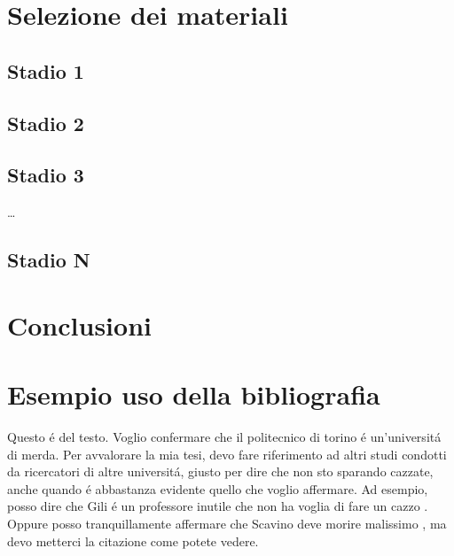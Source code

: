 \documentclass{article}
\begin{document}
    \section{Selezione dei materiali}
        \subsection{Stadio 1}
        \subsection{Stadio 2}
        \subsection{Stadio 3}
        \dots
        \subsection{Stadio N}
    \section{Conclusioni}
    \section{Esempio uso della bibliografia}
    Questo é del testo. Voglio confermare che il politecnico di torino
    é un'universitá di merda.\newline
    Per avvalorare la mia tesi, devo fare riferimento ad altri studi condotti da ricercatori di altre
    universitá, giusto per dire che non sto sparando cazzate, anche quando é
    abbastanza evidente quello che voglio affermare.\newline
    Ad esempio, posso dire che Gili é un professore inutile che
    non ha voglia di fare un cazzo \autocite{ActaMaterialia_myst_fail}.\newline
    Oppure posso tranquillamente affermare che Scavino deve morire 
    malissimo \autocite{example}, ma devo metterci la citazione come potete vedere.
    
    \printbibliography
    
\end{document}
